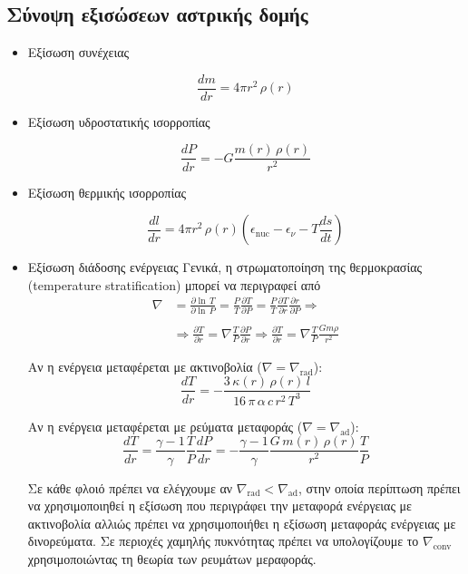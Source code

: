 \subsection{Σύνοψη εξισώσεων αστρικής δομής}
\begin{itemize}
    \item Εξίσωση συνέχειας
    
    \begin{equation*}
        \frac{dm}{dr} = 4\pi r^2 \, \rho(r)
    \end{equation*}
    
    \item Εξίσωση υδροστατικής ισορροπίας
    
    \begin{equation*}
        \frac{dP}{dr} = - G \frac{m(r) \,\rho(r)}{r^2}
    \end{equation*}
    
    \item Εξίσωση θερμικής ισορροπίας
    
    \begin{equation*}
        \frac{dl}{dr} = 4\pi r^2 \,\rho(r) \left(\epsilon_{\text{nuc}} - \epsilon_\nu - T \frac{ds}{dt} \right)
    \end{equation*}
    
    \item Εξίσωση διάδοσης ενέργειας
    Γενικά, η στρωματοποίηση της θερμοκρασίας (temperature stratification) μπορεί να περιγραφεί από 
    \begin{align*}
        \nabla &= \frac{\partial \ln \,T}{\partial \ln \,P} = \frac{P}{T} \frac{\partial T}{\partial P} = \frac{P}{T} \frac{\partial T}{\partial r} \frac{\partial r}{\partial P}  \Rightarrow \\\\
        & \Rightarrow \frac{\partial T}{\partial r} = \nabla \frac{T}{P} \frac{\partial P}{\partial r} \Rightarrow \boxed{\frac{\partial T}{\partial r} = \nabla \frac{T}{P} \frac{Gm \rho}{r^2}}
    \end{align*}
    
    Αν η ενέργεια μεταφέρεται με ακτινοβολία ($\nabla = \nabla_{\text{rad}}$):
    \begin{equation*}
        \frac{dT}{dr} = - \frac{3 \,\kappa(r) \,\rho(r) \,l}{16 \,\pi \,\alpha \,c \,r^2 \,T^3}
    \end{equation*}
    
    Αν η ενέργεια μεταφέρεται με ρεύματα μεταφοράς ($\nabla = \nabla_{\text{ad}}$):
    \begin{equation*}
        \frac{dT}{dr} = \frac{\gamma - 1}{\gamma} \frac{T}{P} \frac{dP}{dr} = - \frac{\gamma - 1}{\gamma} \frac{G \,m(r) \,\rho(r)}{r^2} \frac{T}{P}
    \end{equation*}
    
    Σε κάθε φλοιό πρέπει να ελέγχουμε αν $\nabla_{\text{rad}} < \nabla_{\text{ad}}$, στην οποία περίπτωση πρέπει να χρησιμοποιηθεί η εξίσωση που περιγράφει την μεταφορά ενέργειας με ακτινοβολία αλλιώς πρέπει να χρησιμοποιήθει η εξίσωση μεταφοράς ενέργειας με δινορεύματα. Σε περιοχές χαμηλής πυκνότητας πρέπει να υπολογίζουμε το $\nabla_{\text{conv}}$ χρησιμοποιώντας τη θεωρία των ρευμάτων μεραφοράς.
\end{itemize}

